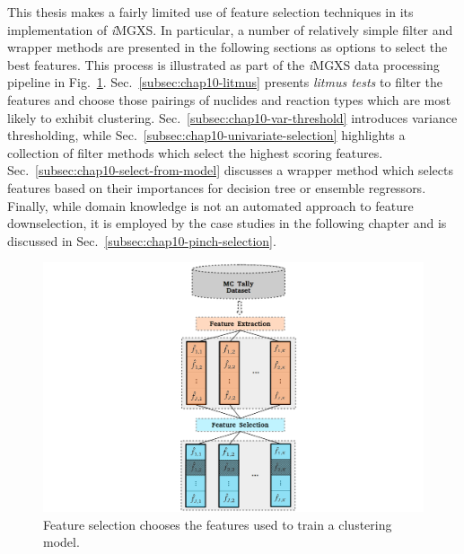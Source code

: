 This thesis makes a fairly limited use of feature selection techniques in its implementation of \textit{i}\ac{MGXS}. In particular, a number of relatively simple filter and wrapper methods are presented in the following sections as options to select the best features. This process is illustrated as part of the \textit{i}\ac{MGXS} data processing pipeline in Fig.~\ref{fig:chap10-select}. Sec.~\ref{subsec:chap10-litmus} presents \textit{litmus tests} to filter the features and choose those pairings of nuclides and reaction types which are most likely to exhibit clustering. Sec.~\ref{subsec:chap10-var-threshold} introduces variance thresholding, while Sec.~\ref{subsec:chap10-univariate-selection} highlights a collection of filter methods which select the highest scoring features. Sec.~\ref{subsec:chap10-select-from-model} discusses a wrapper method which selects features based on their importances for decision tree or ensemble regressors. Finally, while domain knowledge is not an automated approach to feature downselection, it is employed by the case studies in the following chapter and is discussed in Sec.~\ref{subsec:chap10-pinch-selection}.


\begin{figure}[h!]
\centering
\includegraphics[width=0.95\linewidth]{figures/unsupervised/features/engineering/select}
\vspace{2mm}
\caption[\textit{i}MGXS feature selection]{Feature selection chooses the features used to train a clustering model.}
\label{fig:chap10-select}
\end{figure}

